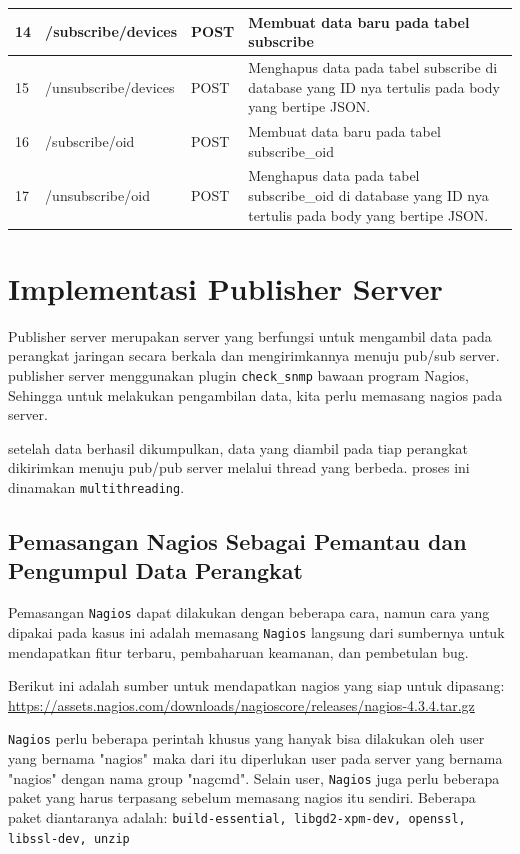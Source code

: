 \begin{longtable}{|p{}|p{}|p{}|p{}|}
        		14 & /subscribe/devices & POST & Membuat data baru pada tabel subscribe \\ \hline
        		15 & /unsubscribe/devices & POST & Menghapus data pada tabel subscribe di database yang ID nya tertulis pada body yang bertipe JSON. \\ \hline
        		16 & /subscribe/oid & POST & Membuat data baru pada tabel subscribe\_oid \\ \hline
        		17 & /unsubscribe/oid & POST & Menghapus data pada tabel subscribe\_oid di database yang ID nya tertulis pada body yang bertipe JSON. \\ \hline	
        	\end{longtable}
        	
    
    \section{Implementasi Publisher Server}
    	Publisher server merupakan server yang berfungsi untuk mengambil data pada perangkat jaringan secara berkala dan mengirimkannya menuju pub/sub server. publisher server menggunakan plugin \texttt{check\_snmp} bawaan program Nagios, Sehingga untuk melakukan pengambilan data, kita perlu memasang nagios pada server.
    	
    	setelah data berhasil dikumpulkan, data yang diambil pada tiap perangkat dikirimkan menuju pub/pub server melalui thread yang berbeda. proses ini dinamakan \texttt{multithreading}.
    		\subsection{Pemasangan Nagios Sebagai Pemantau dan Pengumpul Data Perangkat}
    			Pemasangan \texttt{Nagios} dapat dilakukan dengan beberapa cara, namun cara yang dipakai pada kasus ini adalah memasang \texttt{Nagios} langsung dari sumbernya untuk mendapatkan fitur terbaru, pembaharuan keamanan, dan pembetulan bug.
    			
    			Berikut ini adalah sumber untuk mendapatkan nagios yang siap untuk dipasang: \url{https://assets.nagios.com/downloads/nagioscore/releases/nagios-4.3.4.tar.gz}
    			
    			\texttt{Nagios} perlu beberapa perintah khusus yang hanyak bisa dilakukan oleh user yang bernama "nagios" maka dari itu diperlukan user pada server yang bernama "nagios" dengan nama group "nagcmd". Selain user, \texttt{Nagios} juga perlu beberapa paket yang harus terpasang sebelum memasang nagios itu sendiri. Beberapa paket diantaranya adalah: \texttt{build-essential, libgd2-xpm-dev, openssl, libssl-dev, unzip}
    			
